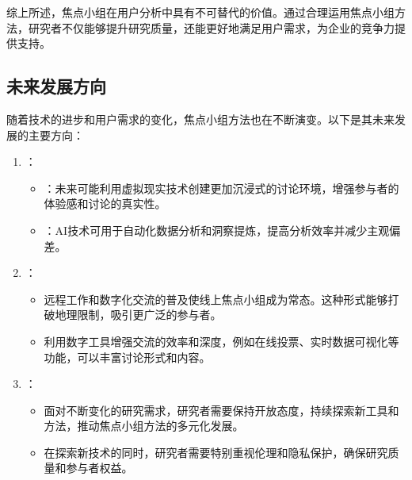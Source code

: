 \documentclass[letterpaper,10pt,english]{sphinxmanual}
\begin{document}
\sphinxAtStartPar
综上所述，焦点小组在用户分析中具有不可替代的价值。通过合理运用焦点小组方法，研究者不仅能够提升研究质量，还能更好地满足用户需求，为企业的竞争力提供支持。


\subsection{未来发展方向}
\label{\detokenize{user-research/focus-group:id46}}
\sphinxAtStartPar
随着技术的进步和用户需求的变化，焦点小组方法也在不断演变。以下是其未来发展的主要方向：
\begin{enumerate}
%
\item {} 
\sphinxAtStartPar
{}：
\begin{itemize}
\item {} 
\sphinxAtStartPar
{}：未来可能利用虚拟现实技术创建更加沉浸式的讨论环境，增强参与者的体验感和讨论的真实性。

\item {} 
\sphinxAtStartPar
{}：AI技术可用于自动化数据分析和洞察提炼，提高分析效率并减少主观偏差。

\end{itemize}

\item {} 
\sphinxAtStartPar
{}：
\begin{itemize}
\item {} 
\sphinxAtStartPar
远程工作和数字化交流的普及使线上焦点小组成为常态。这种形式能够打破地理限制，吸引更广泛的参与者。

\item {} 
\sphinxAtStartPar
利用数字工具增强交流的效率和深度，例如在线投票、实时数据可视化等功能，可以丰富讨论形式和内容。

\end{itemize}

\item {} 
\sphinxAtStartPar
{}：
\begin{itemize}
\item {} 
\sphinxAtStartPar
面对不断变化的研究需求，研究者需要保持开放态度，持续探索新工具和方法，推动焦点小组方法的多元化发展。

\item {} 
\sphinxAtStartPar
在探索新技术的同时，研究者需要特别重视伦理和隐私保护，确保研究质量和参与者权益。

\end{itemize}

\end{enumerate}
\end{document}
